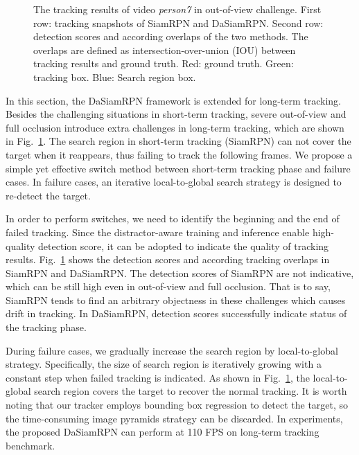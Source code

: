\documentclass[runningheads]{llncs}
\begin{document}
\begin{figure}[t]
\centering
{}
\caption{The tracking results of video \emph{person7} in out-of-view challenge.
 First row: tracking snapshots of SiamRPN and DaSiamRPN. Second row: detection scores and according overlaps of the two methods. The overlaps are defined as intersection-over-union (IOU) between tracking results and ground truth. \color{red} Red: ground truth. \color{green} Green: tracking box.  \color{blue} Blue: Search region box.}
 \label{out-of-view}

\end{figure}

In this section, the DaSiamRPN framework is extended for long-term tracking. Besides the challenging situations in short-term tracking, severe out-of-view and full occlusion introduce extra challenges in long-term tracking, which are shown in Fig.~\ref{out-of-view}. The search region in short-term tracking (SiamRPN) can not cover the target when it reappears, thus failing to track the following frames.
We propose a simple yet effective switch method between short-term tracking phase and failure cases. In failure cases, an iterative local-to-global search strategy is designed to re-detect the target.

In order to perform switches, we need to identify the beginning and the end of failed tracking. Since the distractor-aware training and inference enable high-quality detection score, it can be adopted to indicate the quality of tracking results. Fig.~\ref{out-of-view} shows the detection scores and according tracking overlaps in SiamRPN and DaSiamRPN. The detection scores of SiamRPN are not indicative, which can be still high even in out-of-view and full occlusion. That is to say, SiamRPN tends to find an arbitrary objectness in these challenges which causes drift in tracking. In DaSiamRPN, detection scores successfully indicate status of the tracking phase.

During failure cases, we gradually increase the search region by local-to-global strategy. Specifically, the size of search region is iteratively growing with a constant step when failed tracking is indicated. As shown in Fig.~\ref{out-of-view}, the local-to-global search region covers the target to recover the normal tracking. It is worth noting that our tracker employs bounding box regression to detect the target, so the time-consuming image pyramids strategy can be discarded. In experiments, the proposed DaSiamRPN can perform at 110 FPS on long-term tracking benchmark.
\end{document}
